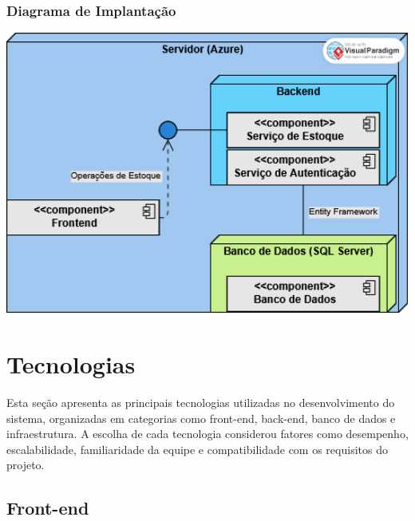 \documentclass[
	12pt,				%
	openany,			%
	twoside,			%
	a4paper,			%
	english,			%
	brazil				%
	]{abntex2}
\begin{document}
\subsubsection{Diagrama de Implantação}


\includegraphics[width=1.0\textwidth]{Figuras/Implantação.png}



\section{Tecnologias}

Esta seção apresenta as principais tecnologias utilizadas no desenvolvimento do sistema, organizadas em categorias como front-end, back-end, banco de dados e infraestrutura. A escolha de cada tecnologia considerou fatores como desempenho, escalabilidade, familiaridade da equipe e compatibilidade com os requisitos do projeto.

\subsection{Front-end}
\end{document}
